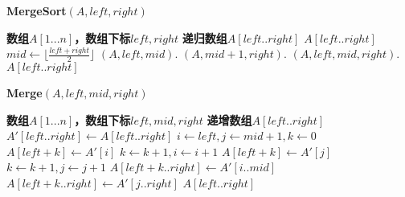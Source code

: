 \documentclass{article}
\begin{document}
\begin{CJK}{UTF8}{gbsn}
        \begin{algorithm}
            \caption{\textbf{MergeSort$(A,left,right)$}}
            \begin{algorithmic}[1] %
                \Require \textbf{数组$A[1...n]$，数组下标$left,right$}
                \Ensure \textbf{递归数组$A[left..right]$}
                    \State \Return $A[left..right]$
                \EndIf
                \State $mid \leftarrow \lfloor \frac{left+right}{2} \rfloor$
                \State {}$(A,left,mid)$.
                \State {}$(A,mid+1,right)$.
                \State {}$(A,left,mid,right)$.
                \State \Return $A[left..right]$
            \end{algorithmic}
        \end{algorithm}
            
        \begin{algorithm}
            \caption{\textbf{Merge$(A,left,mid,right)$}}
            \begin{algorithmic}[1]
                \Require \textbf{数组$A[1...n]$，数组下标$left,mid,right$}
                \Ensure \textbf{递增数组$A[left..right]$}
                \State $A'[left..right] \leftarrow A[left..right]$
                \State $i \leftarrow left, j \leftarrow mid+1,k \leftarrow 0$
                        \State $A[left+k] \leftarrow A'[i]$
                        \State $k \leftarrow k+1, i \leftarrow i+1$
                    \Else
                        \State $A[left+k] \leftarrow A'[j]$
                        \State $k \leftarrow k+1, j \leftarrow j+1$
                    \EndIf
                \EndWhile
                    \State $A[left+k..right] \leftarrow A'[i..mid]$
                \Else
                    \State $A[left+k..right] \leftarrow A'[j..right]$
                \EndIf
                \State \Return $A[left..right]$
            \end{algorithmic}
        \end{algorithm}
        
    \end{CJK}
\end{document}
